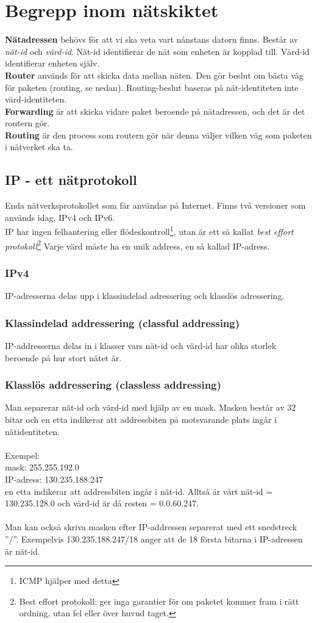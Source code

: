 \documentclass[11pt]{article}
\begin{document}
\section{Begrepp inom nätskiktet}
\textbf{Nätadressen} behövs för att vi ska veta vart nånstans datorn finns. Består av \emph{nät-id} och \emph{värd-id}. Nät-id identifierar de nät som enheten är kopplad till. Värd-id identifierar enheten själv. \\
\textbf{Router} används för att skicka data mellan näten. Den gör beslut om bästa väg för paketen (routing, se nedan). Routing-beslut baseras på nät-identiteten inte värd-identiteten. \\
\textbf{Forwarding} är att skicka vidare paket beroende på nätadressen, och det är det routern gör. \\
\textbf{Routing} är den process som routern gör när denna väljer vilken väg som paketen i nätverket ska ta. 
\subsection{IP - ett nätprotokoll}
Enda nätverksprotokollet som får användas på Internet. Finns två versioner som används idag, IPv4 och IPv6. \\
IP har ingen felhantering eller flödeskontroll\footnote{ICMP hjälper med detta}, utan är ett så kallat \emph{best effort protokoll}\footnote{Best effort protokoll: ger inga garantier för om paketet kommer fram i rätt ordning, utan fel eller över huvud taget.} Varje värd måste ha en unik address, en så kallad IP-adress. 
\subsubsection{IPv4}
IP-adresserna delas upp i klassindelad adressering och klasslös adressering. 
\subsubsection*{Klassindelad addressering (classful addressing)}
IP-addresserna delas in i klasser vars nät-id och värd-id har olika storlek beroende på hur stort nätet är. 
\subsubsection*{Klasslös addressering (classless addressing)}
Man separerar nät-id och värd-id med hjälp av en mask. Masken består av 32 bitar och en etta indikerar att addressbiten på motsvarande plats ingår i nätidentiteten. \\ \\
Exempel: \\
mask: 255.255.192.0 \\
IP-adress: 130.235.188.247 \\
en etta indikerar att addressbiten ingår i nät-id. Alltså är vårt nät-id = 130.235.128.0 och värd-id är då resten = 0.0.60.247. \\ \\
Man kan också skriva masken efter IP-addressen separerat med ett snedstreck ''/''. Exempelvis 130.235.188.247/18 anger att de 18 första bitarna i IP-adressen är nät-id.
\end{document}

